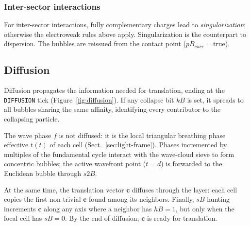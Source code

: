 \documentclass{ijuc}
\begin{document}
\subsubsection{Inter-sector interactions}
For inter-sector interactions, fully complementary charges lead to \textit{singularization}; otherwise the electroweak rules above apply. Singularization is the counterpart to dispersion. 
The bubbles are reissued from the contact point ($pB_{curr}=\text{true}$).


\subsection{Diffusion}

Diffusion propagates the information needed for translation, ending at the \texttt{DIFFUSION} tick (Figure~\ref{fig:diffusion}). If any collapse bit $kB$ is set, it spreads to all bubbles sharing the same affinity, identifying every contributor to the collapsing particle.

The wave phase $f$ is not diffused: it is the local triangular breathing phase $\mathrm{effective\_t}(t)$ of each cell (Sect.~\ref{sec:light-frame}). Phases incremented by multiples of the fundamental cycle interact with the wave-cloud sieve to form concentric bubbles; the active wavefront point ($t=d$) is forwarded to the Euclidean bubble through $s2B$.

At the same time, the translation vector $\mathbf{c}$ diffuses through the layer: each cell copies the first non-trivial $\mathbf{c}$ found among its neighbors. Finally, $sB$ hunting increments $\boldsymbol{c}$ along any axis where a neighbor has $hB=1$, but only when the local cell has $sB=0$. By the end of diffusion, $\boldsymbol{c}$ is ready for translation.
\end{document}
